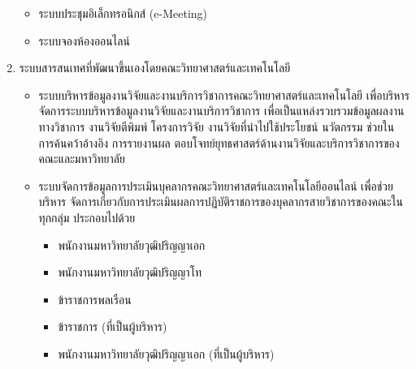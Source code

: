 \begin{enumerate}
\begin{itemize}
	\item ระบบประชุมอิเล็กทรอนิกส์ (e-Meeting)
	\item ระบบจองห้องออนไลน์
\end{itemize}
\item ระบบสารสนเทศที่พัฒนาขึ้นเองโดยคณะวิทยาศาสตร์และเทคโนโลยี 
\begin{itemize}
	\item ระบบบริหารข้อมูลงานวิจัยและงานบริการวิชาการคณะวิทยาศาสตร์และเทคโนโลยี เพื่อบริหาร
	จัดการระบบบริหารข้อมูลงานวิจัยและงานบริการวิชาการ เพื่อเป็นแหล่งรวบรวมข้อมูลผลงานทางวิชาการ งานวิจัยตีพิมพ์ โครงการวิจัย งานวิจัยที่นำไปใช้ประโยชน์ นวัตกรรม ช่วยในการค้นคว้าอ้างอิง การรายงานผล ตอบโจทย์ยุทธศาสตร์ด้านงานวิจัยและบริการวิชาการของคณะและมหาวิทยาลัย
	\item 	ระบบจัดการข้อมูลการประเมินบุคลากรคณะวิทยาศาสตร์และเทคโนโลยีออนไลน์ เพื่อช่วยบริหาร
	จัดการเกี่ยวกับการประเมินผลการปฏิบัติราชการของบุคลากรสายวิชาการของคณะในทุกกลุ่ม ประกอบไปด้วย 
	\begin{itemize}
	\item พนักงานมหาวิทยาลัยวุฒิปริญญาเอก
	\item พนักงานมหาวิทยาลัยวุฒิปริญญาโท 
	\item ข้าราชการพลเรือน 
	\item ข้าราชการ (ที่เป็นผู้บริหาร)
	\item พนักงานมหาวิทยาลัยวุฒิปริญญาเอก (ที่เป็นผู้บริหาร) 
	\end{itemize}
\end{itemize}
\end{enumerate}

\begin{doclist}
\end{doclist}

